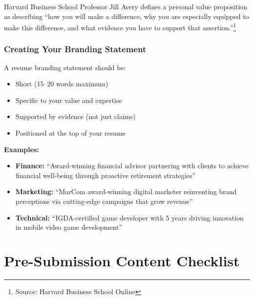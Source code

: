 \documentclass[11pt,a4paper]{article}
\begin{document}
Harvard Business School Professor Jill Avery defines a personal value proposition as describing ``how you will make a difference, why you are especially equipped to make this difference, and what evidence you have to support that assertion.''\footnote{Source: Harvard Business School Online}

\subsubsection{Creating Your Branding Statement}

A resume branding statement should be:
\begin{itemize}
    \item Short (15--20 words maximum)
    \item Specific to your value and expertise
    \item Supported by evidence (not just claims)
    \item Positioned at the top of your resume
\end{itemize}

\textbf{Examples:}
\begin{itemize}
    \item \textbf{Finance:} ``Award-winning financial advisor partnering with clients to achieve financial well-being through proactive retirement strategies''
    \item \textbf{Marketing:} ``MarCom award-winning digital marketer reinventing brand perceptions via cutting-edge campaigns that grow revenue''
    \item \textbf{Technical:} ``IGDA-certified game developer with 5 years driving innovation in mobile video game development''
\end{itemize}

\section{Pre-Submission Content Checklist}
\end{document}
